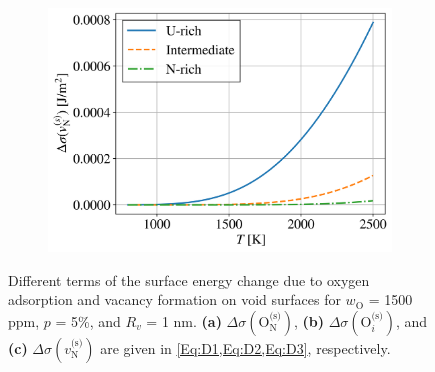 \documentclass[preprint,12pt,sort&compress]{elsarticle}
\newcommand{\?}{\stackrel{?}{=}}
\begin{document}
\begin{figure}[h!]
\begin{subfigure}{0.48\textwidth}
    \includegraphics[width=\textwidth]{Delta3.png}
    \caption{}
    \label{Fig:D3}
\end{subfigure}
\caption{Different terms of the surface energy change due to oxygen adsorption and vacancy formation on void surfaces for $w_\text{O}$ = 1500 ppm, $p$ = 5\%, and $R_v$ = 1 nm. \textbf{(a)} $\Delta \sigma ( \text{O}_\text{N}^{\text{(s)}} )$, \textbf{(b)} $\Delta \sigma ( \text{O}_i^{\text{(s)}} )$, and \textbf{(c)} $\Delta \sigma (v_\text{N}^{\text{(s)}})$ are given in \cref{Eq:D1,Eq:D2,Eq:D3}, respectively.}
\label{Fig:D}
\end{figure}
\end{document}
